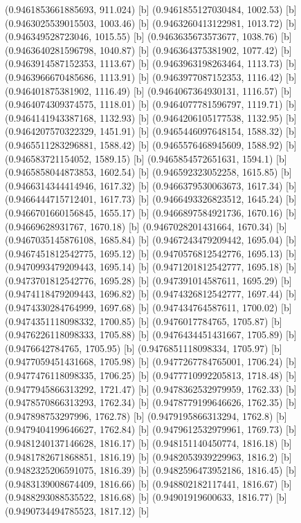 {{{(0.9461853661885693, 911.024) [b] 
(0.9461855127030484, 1002.53) [b] 
(0.9463025539015503, 1003.46) [b] 
(0.9463260413122981, 1013.72) [b] 
(0.946349528723046, 1015.55) [b] 
(0.9463635673573677, 1038.76) [b] 
(0.9463640281596798, 1040.87) [b] 
(0.946364375381902, 1077.42) [b] 
(0.9463914587152353, 1113.67) [b] 
(0.9463963198263464, 1113.73) [b] 
(0.9463966670485686, 1113.91) [b] 
(0.9463977087152353, 1116.42) [b] 
(0.946401875381902, 1116.49) [b] 
(0.9464067364930131, 1116.57) [b] 
(0.9464074309374575, 1118.01) [b] 
(0.9464077781596797, 1119.71) [b] 
(0.9464141943387168, 1132.93) [b] 
(0.9464206105177538, 1132.95) [b] 
(0.9464207570322329, 1451.91) [b] 
(0.9465446097648154, 1588.32) [b] 
(0.9465511283296881, 1588.42) [b] 
(0.9465576468945609, 1588.92) [b] 
(0.946583721154052, 1589.15) [b] 
(0.9465854572651631, 1594.1) [b] 
(0.9465858044873853, 1602.54) [b] 
(0.946592323052258, 1615.85) [b] 
(0.9466314344414946, 1617.32) [b] 
(0.9466379530063673, 1617.34) [b] 
(0.9466444715712401, 1617.73) [b] 
(0.9466493326823512, 1645.24) [b] 
(0.9466701660156845, 1655.17) [b] 
(0.9466897584921736, 1670.16) [b] 
(0.94669628931767, 1670.18) [b] 
(0.9467028201431664, 1670.34) [b] 
(0.9467035145876108, 1685.84) [b] 
(0.9467243479209442, 1695.04) [b] 
(0.9467451812542775, 1695.12) [b] 
(0.9470576812542776, 1695.13) [b] 
(0.9470993479209443, 1695.14) [b] 
(0.9471201812542777, 1695.18) [b] 
(0.9473701812542776, 1695.28) [b] 
(0.947391014587611, 1695.29) [b] 
(0.9474118479209443, 1696.82) [b] 
(0.9474326812542777, 1697.44) [b] 
(0.9474330284764999, 1697.68) [b] 
(0.947434764587611, 1700.02) [b] 
(0.9474351118098332, 1700.85) [b] 
(0.9476017784765, 1705.87) [b] 
(0.9476226118098333, 1705.88) [b] 
(0.9476434451431667, 1705.89) [b] 
(0.9476642784765, 1705.95) [b] 
(0.9476851118098334, 1705.97) [b] 
(0.9477059451431668, 1705.98) [b] 
(0.9477267784765001, 1706.24) [b] 
(0.9477476118098335, 1706.25) [b] 
(0.9477710992205813, 1718.48) [b] 
(0.9477945866313292, 1721.47) [b] 
(0.9478362532979959, 1762.33) [b] 
(0.9478570866313293, 1762.34) [b] 
(0.9478779199646626, 1762.35) [b] 
(0.947898753297996, 1762.78) [b] 
(0.9479195866313294, 1762.8) [b] 
(0.9479404199646627, 1762.84) [b] 
(0.9479612532979961, 1769.73) [b] 
(0.9481240137146628, 1816.17) [b] 
(0.948151140450774, 1816.18) [b] 
(0.9481782671868851, 1816.19) [b] 
(0.9482053939229963, 1816.2) [b] 
(0.9482325206591075, 1816.39) [b] 
(0.9482596473952186, 1816.45) [b] 
(0.9483139008674409, 1816.66) [b] 
(0.948802182117441, 1816.67) [b] 
(0.9488293088535522, 1816.68) [b] 
(0.94901919600633, 1816.77) [b] 
(0.9490734494785523, 1817.12) [b] 
}}}
